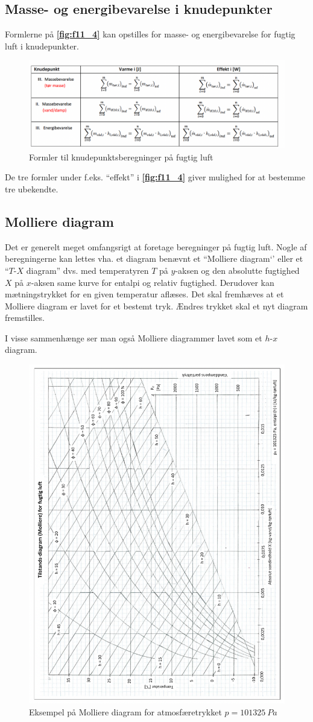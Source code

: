 \subsection{Masse- og energibevarelse i knudepunkter}
Formlerne på \textbf{\autoref{fig:f11_4}} kan opstilles for masse- og energibevarelse for fugtig luft i knudepunkter. 

\begin{figure} [ht]
  \centering
  \includegraphics[width=0.5\linewidth]{./figures/f11_4.png}
  \caption{Formler til knudepunktsberegninger på fugtig luft}
  \label{fig:f11_4}
\end{figure}

De tre formler under f.eks. ``effekt'' i \textbf{\autoref{fig:f11_4}} giver mulighed for at bestemme tre ubekendte.


\subsection{Molliere diagram}
Det er generelt meget omfangsrigt at foretage beregninger på fugtig luft. Nogle af beregningerne kan lettes vha. et diagram benævnt et ``Molliere diagram`' eller et ``$T$-$X$ diagram'' dvs. med temperatyren $T$ på $y$-aksen og den absolutte fugtighed $X$ på $x$-aksen same kurve for entalpi og relativ fugtighed. Derudover kan mætningstrykket for en given temperatur aflæses. Det skal fremhæves at et Molliere diagram er lavet for et bestemt tryk. Ændres trykket skal et nyt diagram fremstilles.

I visse sammenhænge ser man også Molliere diagrammer lavet som et $h$-$x$ diagram. 

\begin{figure} [ht]
  \centering
  \includegraphics[width=0.5\linewidth, angle=-90]{./figures/f11_5.png}
  \caption{Eksempel på Molliere diagram for atmosfæretrykket $p = \qty{101325}{Pa}$}
  \label{fig:f11_5}
\end{figure}

